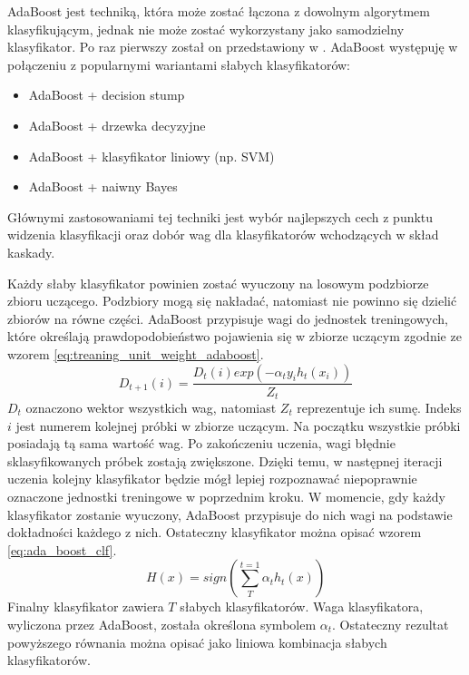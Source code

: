 AdaBoost jest techniką, która może zostać łączona z dowolnym algorytmem klasyfikującym, jednak nie może zostać wykorzystany jako samodzielny klasyfikator.
Po raz pierwszy został on przedstawiony w \cite{Freund1996ExperimentsWA}.
AdaBoost występuję w połączeniu z popularnymi wariantami słabych klasyfikatorów:
\begin{itemize}
    \item AdaBoost + decision stump
    \item AdaBoost + drzewka decyzyjne
    \item AdaBoost + klasyfikator liniowy (np. SVM)
    \item AdaBoost + naiwny Bayes
\end{itemize}
Głównymi zastosowaniami tej techniki jest wybór najlepszych cech z punktu widzenia klasyfikacji oraz dobór wag dla klasyfikatorów wchodzących w skład kaskady.

Każdy słaby klasyfikator powinien zostać wyuczony na losowym podzbiorze zbioru uczącego.
Podzbiory mogą się nakładać, natomiast nie powinno się dzielić zbiorów na równe części.
AdaBoost przypisuje wagi do jednostek treningowych, które określają prawdopodobieństwo pojawienia się w zbiorze uczącym zgodnie ze wzorem \ref{eq:treaning_unit_weight_adaboost}.
\begin{equation}
    \label{eq:treaning_unit_weight_adaboost}
    D_{t+1}(i) = \dfrac{D_t(i)exp(-\alpha_t y_i h_t(x_i))}{Z_t}
\end{equation}
$D_t$ oznaczono wektor wszystkich wag, natomiast $Z_t$ reprezentuje ich sumę.
Indeks $i$ jest numerem kolejnej próbki w zbiorze uczącym.
Na początku wszystkie próbki posiadają tą sama wartość wag.
Po zakończeniu uczenia, wagi błędnie sklasyfikowanych próbek zostają zwiększone.
Dzięki temu, w następnej iteracji uczenia kolejny klasyfikator będzie mógł lepiej rozpoznawać niepoprawnie oznaczone jednostki treningowe w poprzednim kroku.
W momencie, gdy każdy klasyfikator zostanie wyuczony, AdaBoost przypisuje do nich wagi na podstawie dokładności każdego z nich.
Ostateczny klasyfikator można opisać wzorem \ref{eq:ada_boost_clf}.
\begin{equation}
    \label{eq:ada_boost_clf}
    H(x) = sign(\sum_{T}^{t=1} \alpha_t h_t(x))
\end{equation}
Finalny klasyfikator zawiera $T$ słabych klasyfikatorów.
Waga klasyfikatora, wyliczona przez AdaBoost, została określona symbolem $\alpha_t$.
Ostateczny rezultat powyższego równania można opisać jako liniowa kombinacja słabych klasyfikatorów.

